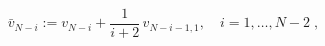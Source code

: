 \begin{equation}
\bar v_{N-i} :=v_{N-i} + \frac{1}{i+2}\, v_{N-i-1,1}, \quad
i=1,\dots,N-2 \; , 
\label{B8} 
\end{equation}

